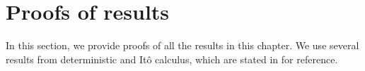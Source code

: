 





\section{Proofs of results}\label{sec:paper_proofs}
In this section, we provide proofs of all the results in this chapter.
We use several results from deterministic and It\^o calculus, which are stated in  for reference.

